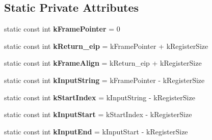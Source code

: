 \subsection*{Static Private Attributes}
\begin{DoxyCompactItemize}
\item 
static const int {\bfseries k\+Frame\+Pointer} = 0\hypertarget{classv8_1_1internal_1_1_reg_exp_macro_assembler_x64_a95618ff57f72ec86299e0729717564b4}{}\label{classv8_1_1internal_1_1_reg_exp_macro_assembler_x64_a95618ff57f72ec86299e0729717564b4}

\item 
static const int {\bfseries k\+Return\+\_\+eip} = k\+Frame\+Pointer + k\+Register\+Size\hypertarget{classv8_1_1internal_1_1_reg_exp_macro_assembler_x64_a6e3af88d68b1f765dc92619ae8b8aee6}{}\label{classv8_1_1internal_1_1_reg_exp_macro_assembler_x64_a6e3af88d68b1f765dc92619ae8b8aee6}

\item 
static const int {\bfseries k\+Frame\+Align} = k\+Return\+\_\+eip + k\+Register\+Size\hypertarget{classv8_1_1internal_1_1_reg_exp_macro_assembler_x64_a4a38a894ac64ad857c1ea5875967f1b0}{}\label{classv8_1_1internal_1_1_reg_exp_macro_assembler_x64_a4a38a894ac64ad857c1ea5875967f1b0}

\item 
static const int {\bfseries k\+Input\+String} = k\+Frame\+Pointer -\/ k\+Register\+Size\hypertarget{classv8_1_1internal_1_1_reg_exp_macro_assembler_x64_aba482b2cad850b01eddce02237c8829e}{}\label{classv8_1_1internal_1_1_reg_exp_macro_assembler_x64_aba482b2cad850b01eddce02237c8829e}

\item 
static const int {\bfseries k\+Start\+Index} = k\+Input\+String -\/ k\+Register\+Size\hypertarget{classv8_1_1internal_1_1_reg_exp_macro_assembler_x64_a62155f5659f020d5c37fc6fd8e5679c5}{}\label{classv8_1_1internal_1_1_reg_exp_macro_assembler_x64_a62155f5659f020d5c37fc6fd8e5679c5}

\item 
static const int {\bfseries k\+Input\+Start} = k\+Start\+Index -\/ k\+Register\+Size\hypertarget{classv8_1_1internal_1_1_reg_exp_macro_assembler_x64_aa826e33a684765a358402bab810cb151}{}\label{classv8_1_1internal_1_1_reg_exp_macro_assembler_x64_aa826e33a684765a358402bab810cb151}

\item 
static const int {\bfseries k\+Input\+End} = k\+Input\+Start -\/ k\+Register\+Size\hypertarget{classv8_1_1internal_1_1_reg_exp_macro_assembler_x64_a9be28ef727b82c0b06304bd8f2377d51}{}\label{classv8_1_1internal_1_1_reg_exp_macro_assembler_x64_a9be28ef727b82c0b06304bd8f2377d51}


\end{DoxyCompactItemize}
